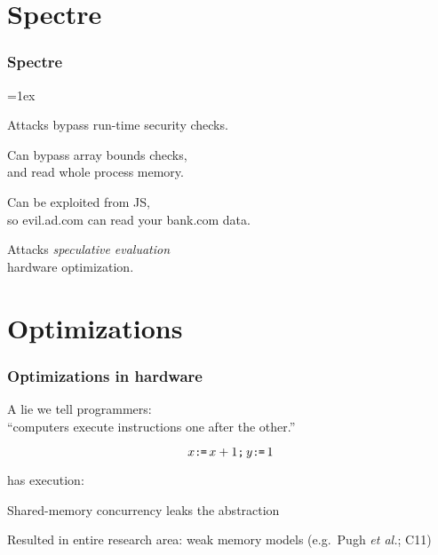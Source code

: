 \documentclass[aspectratio=169]{beamer}
\begin{document}
\section{Spectre}
\begin{frame}
  \frametitle{Spectre}

  {\fboxrule=1ex\fboxsep=0pt}\quad
  \begin{minipage}[b]{.6\textwidth}\raggedright
    Attacks bypass run-time security checks.
    
    \bigskip
    Can bypass array bounds checks,\\
    and read whole process memory.

    \bigskip
    Can be exploited from JS,\\
    so evil.ad.com can read your bank.com data.

    \bigskip
    Attacks \emph{speculative evaluation}\\
    hardware optimization.
    
  \end{minipage}
\end{frame}

\section{Optimizations}
\begin{frame}
  \frametitle{Optimizations in hardware}
  
  A lie we tell programmers:\\
  ``computers execute instructions one after the other.''

  \[ x\texttt{:}\mkern-1mu\texttt{=}\,x+1\texttt{;}\, y\texttt{:}\mkern-1mu\texttt{=}\,1 \]

  has execution:
  
\begin{tikzdisplay}[node distance=1em]
\end{tikzdisplay}

  \pause

  \pause Shared-memory concurrency leaks the abstraction

  \medskip
  \pause Resulted in entire research area: weak memory models (e.g.~Pugh \emph{et al.}; C11)

\end{frame}
\end{document}
